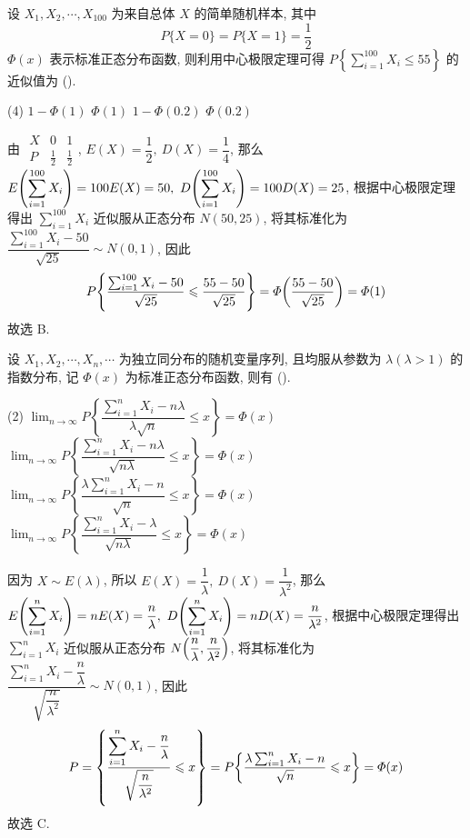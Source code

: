 \begin{example}[2022 数一]
    设 $ X_{1}, X_{2}, \cdots, X_{100} $ 为来自总体 $ X $ 的简单随机样本, 
    其中 $$ P\{X=0\}=P\{X=1\}=\dfrac{1}{2}$$ 
    $\varPhi(x) $ 表示标准正态分布函数, 则利用中心极限定理可得 $ \displaystyle P\left\{\sum_{i=1}^{100} X_{i} \leqslant 55\right\} $ 的近似值为 (\quad).
    \begin{tasks}(4)
        \task $1-\varPhi(1)$
        \task $\varPhi(1)$
        \task $1-\varPhi(0.2)$
        \task $\varPhi(0.2)$
    \end{tasks}
\end{example}
\begin{solution}
    由 $\begin{array}{c|cc}
        X & 0           & 1           \\\hline
        P & \frac{1}{2} & \frac{1}{2}
    \end{array}$, $E(X)=\dfrac{1}{2},~D(X)=\dfrac{1}{4}$, 那么 $\displaystyle E\qty(\sum_{i=1}^{100}X_i)=100E(X)=50,~D\qty(\sum_{i=1}^{100}X_i)=100 D(X)=25$, 根据中心极限定理得出
    $\displaystyle\sum_{i=1}^{100}X_i$ 近似服从正态分布 $N(50,25)$, 将其标准化为 $\dfrac{\displaystyle\sum_{i=1}^{100}X_i-50}{\sqrt{25}}\sim N(0,1)$, 因此 
    $$P\qty{\dfrac{\sum_{i=1}^{100}X_i-50}{\sqrt{25}}\leqslant \dfrac{55-50}{\sqrt{25}}}=\varPhi\qty(\dfrac{55-50}{\sqrt{25}})=\varPhi(1)$$
    故选 B.
\end{solution}

\begin{example}
    设 $ X_{1}, X_{2}, \cdots, X_{n}, \cdots $ 为独立同分布的随机变量序列, 且均服从参数为 $ \lambda(\lambda>1) $ 的指数分布, 记 $ \varPhi(x) $ 为标准正态分布函数, 则有 (\quad).
    \begin{tasks}(2)
        \task $\displaystyle \lim _{n \rightarrow \infty} P\left\{\dfrac{\sum_{i=1}^{n} X_{i}-n \lambda}{\lambda \sqrt{n}} \leqslant x\right\}=\varPhi(x) $
        \task $\displaystyle \lim _{n \rightarrow \infty} P\left\{\dfrac{\sum_{i=1}^{n} X_{i}-n \lambda}{\sqrt{n \lambda}} \leqslant x\right\}=\varPhi(x) $
        \task $\displaystyle \lim _{n \rightarrow \infty} P\left\{\dfrac{\lambda \sum_{i=1}^{n} X_{i}-n}{\sqrt{n}} \leqslant x\right\}=\varPhi(x) $
        \task $\displaystyle \lim _{n \rightarrow \infty} P\left\{\dfrac{\sum_{i=1}^{n} X_{i}-\lambda}{\sqrt{n \lambda}} \leqslant x\right\}=\varPhi(x) $
    \end{tasks}
\end{example}
\begin{solution}
    因为 $X\sim E(\lambda)$, 所以 $E(X)=\dfrac{1}{\lambda},~D(X)=\dfrac{1}{\lambda^2}$, 那么 $E\qty(\displaystyle\sum_{i=1}^{n}X_i)=nE(X)=\dfrac{n}{\lambda},~D\qty(\displaystyle \sum_{i=1}^{n}X_i)=nD(X)=\dfrac{n}{\lambda^2}$, 
    根据中心极限定理得出 $\displaystyle\sum_{i=1}^{n}X_i$ 近似服从正态分布 $N\qty(\dfrac{n}{\lambda},\dfrac{n}{\lambda^2})$, 将其标准化为 $\dfrac{\displaystyle\sum_{i=1}^{n}X_i-\dfrac{n}{\lambda}}{\sqrt{\dfrac{n}{\lambda^2}}}\sim N(0,1)$, 因此 
    $$P=\qty{\dfrac{\displaystyle\sum_{i=1}^{n}X_i-\dfrac{n}{\lambda}}{\sqrt{\dfrac{n}{\lambda^2}}}\leqslant x}=P\qty{\dfrac{\lambda\sum_{i=1}^{n}X_i-n}{\sqrt{n}}\leqslant x}=\varPhi(x)$$
    故选 C.
\end{solution}

